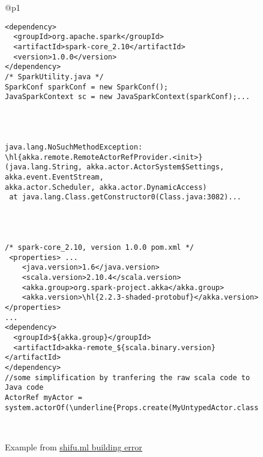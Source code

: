 \begin{figure}[!htb]
\begin{minipage}{0.5\textwidth}
\begin{tabular}{@{}p{}}
\begin{Verbatim}[commandchars=\\\{\}, tabsize=2]
<dependency>
  <groupId>org.apache.spark</groupId>
  <artifactId>spark-core_2.10</artifactId>
  <version>1.0.0</version>
</dependency>
/* SparkUtility.java */
SparkConf sparkConf = new SparkConf();
JavaSparkContext sc = new JavaSparkContext(sparkConf);...
 \end{Verbatim}
   \vspace{-4mm}
  \\ \hline
        \\ \hline
    \vspace{-4mm}
\begin{Verbatim}[commandchars=\\\{\}, tabsize=2]
java.lang.NoSuchMethodException: \hl{akka.remote.RemoteActorRefProvider.<init>}
(java.lang.String, akka.actor.ActorSystem$Settings, akka.event.EventStream, 
akka.actor.Scheduler, akka.actor.DynamicAccess)
 at java.lang.Class.getConstructor0(Class.java:3082)...
 \end{Verbatim}
   \vspace{-4mm}
  \\ \hline
     \\ \hline
  \vspace{-4mm}
\begin{Verbatim}[commandchars=\\\{\}, tabsize=2]
/* spark-core_2.10, version 1.0.0 pom.xml */
 <properties> ...
    <java.version>1.6</java.version>
    <scala.version>2.10.4</scala.version>
    <akka.group>org.spark-project.akka</akka.group>
    <akka.version>\hl{2.2.3-shaded-protobuf}</akka.version>
</properties>
...
<dependency>
  <groupId>${akka.group}</groupId>
  <artifactId>akka-remote_${scala.binary.version}</artifactId>
</dependency>
//some simplification by tranfering the raw scala code to Java code
ActorRef myActor = system.actorOf(\underline{Props.create(MyUntypedActor.class)},"myactor");...
  \end{Verbatim}
        \vspace{-4mm}
     \\ \hline
  
\end{tabular} 
\caption{Example from \underline{\href{https://travis-ci.org/lisahua/shifu/builds/29112815}{shifu.ml building error}}}
\label{fig:shifu}
\end{minipage}
\end{figure}